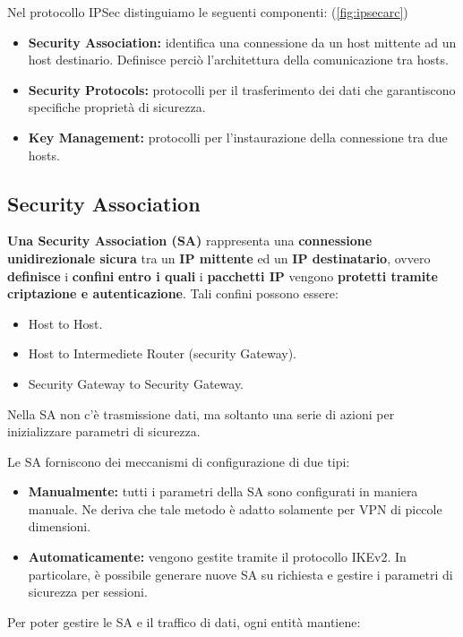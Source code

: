 \begin{definition}\label{def:ipsecarc}
Nel protocollo IPSec distinguiamo le seguenti componenti: (\cref{fig:ipsecarc})
\begin{itemize}
    \item \textbf{Security Association:} identifica una connessione da un host mittente ad un host destinario. Definisce perciò l'architettura della comunicazione tra hosts.
    \item \textbf{Security Protocols:} protocolli per il trasferimento dei dati che garantiscono specifiche proprietà di sicurezza.
    \item \textbf{Key Management:} protocolli per l’instaurazione della connessione tra due hosts.
\end{itemize}
\end{definition}
\subsection{Security Association}
\textbf{Una Security Association (SA)} rappresenta una \textbf{connessione unidirezionale sicura} tra un \textbf{IP mittente} ed un \textbf{IP destinatario}, ovvero \textbf{definisce} i \textbf{confini} \textbf{entro i quali} i \textbf{pacchetti IP} vengono \textbf{protetti tramite criptazione e autenticazione}. Tali confini possono essere:
\begin{itemize}
    \item Host to Host.
    \item Host to Intermediete Router (security Gateway).
    \item Security Gateway to Security Gateway.
\end{itemize}
\begin{remark}
Nella SA non c'è trasmissione dati, ma soltanto una serie di azioni per inizializzare parametri di sicurezza.
\end{remark}
\begin{proposition}[SA Setup]\label{prop:sasetup}
Le SA forniscono dei meccanismi di configurazione di due tipi:
\begin{itemize}
    \item \textbf{Manualmente:} tutti i parametri della SA sono configurati in maniera manuale. Ne deriva che tale metodo è adatto solamente per VPN di piccole dimensioni.
    \item \textbf{Automaticamente:} vengono gestite tramite il protocollo IKEv2. In particolare, è possibile generare nuove SA su richiesta e gestire i parametri di sicurezza per sessioni.
\end{itemize}
\end{proposition}
Per poter gestire le SA e il traffico di dati, ogni entità mantiene:

